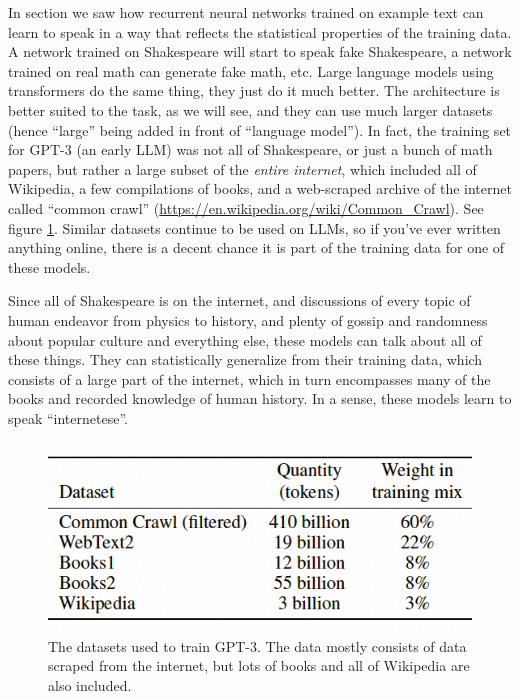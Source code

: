 In section  we saw how recurrent neural networks trained on example text can learn to speak in a way that reflects the statistical properties of the training data. A network trained on Shakespeare will start to speak fake Shakespeare, a network trained on real math can generate fake math, etc.  Large language models using transformers do the same thing, they just do it much better. The architecture is better suited to the task, as we will see, and they can use much larger datasets (hence ``large'' being added in front of ``language model''). In fact, the training set for GPT-3 (an early LLM) was not all of Shakespeare, or just a bunch of math papers, but rather a large subset of the \emph{entire internet}, which included all of Wikipedia, a few compilations of books, and a web-scraped archive of the internet called ``common crawl'' (\url{https://en.wikipedia.org/wiki/Common_Crawl}).  See figure \ref{gptDatasets}. Similar datasets continue to be used on LLMs, so if you've ever written anything online, there is a decent chance it is part of the training data for one of these models. 

Since all of Shakespeare is on the internet, and discussions of every topic of human endeavor from physics to history, and plenty of gossip and randomness about popular culture and everything else, these models can talk about all of these things. They can statistically generalize from their training data, which consists of a large part of the internet, which in turn encompasses many of the books and recorded knowledge of human history. In a sense, these models learn to speak ``internetese''.  

\begin{figure}[h]
\centering
\includegraphics[scale=.4]{./images/gptDatasets}
\caption[From \cite{brown2020language}.]{The datasets used to train GPT-3. The data mostly consists of data scraped from the internet, but lots of books and all of Wikipedia are also included.}
\label{gptDatasets}
\end{figure}

